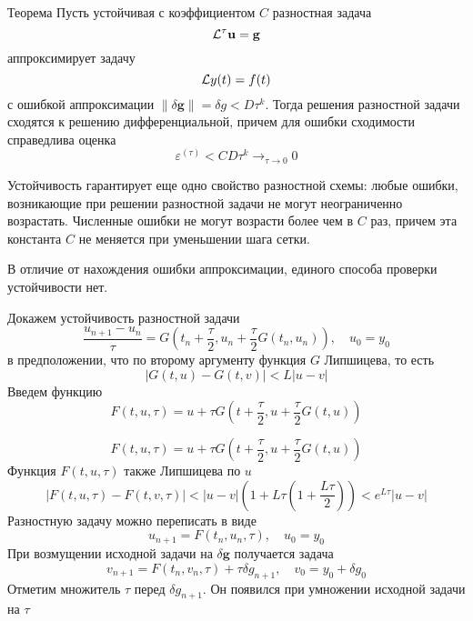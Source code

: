 \documentclass[professionalfonts,compress,unicode]{beamer}
\begin{document}
{
	\begin{block}{Теорема}
		Пусть устойчивая с коэффициентом $C$ разностная задача 
		$$
		{\mathcal{L}^{\tau}} \mathbf{u} = \mathbf{g}
		$$
		аппроксимирует задачу
		$$
		\mathcal{L} y(t) = f(t)
		$$
		с ошибкой аппроксимации $\|\delta \mathbf{g}\| = \delta g < D \tau^k$. Тогда решения разностной задачи 
		сходятся к решению дифференциальной, причем для ошибки сходимости справедлива оценка
		$$
		\varepsilon^{(\tau)} < C D \tau^k \mathop{\longrightarrow}_{\tau \rightarrow 0} 0
		$$
	\end{block}
}


{
%	
	Устойчивость гарантирует еще одно свойство разностной схемы: любые ошибки, возникающие при 
	решении разностной задачи не могут неограниченно возрастать. Численные ошибки не могут возрасти более чем в 
	$C$ раз, причем эта константа $C$ не меняется при уменьшении шага сетки.
}

{
	В отличие от нахождения ошибки аппроксимации, единого способа проверки устойчивости нет.
	
	Докажем устойчивость разностной задачи
	$$
	\frac{u_{n+1}-u_n}{\tau} = G\left(t_n+\frac{\tau}{2},u_n + \frac{\tau}{2}G(t_n, u_n)\right),\quad u_0 = y_0
	$$
	в предположении, что по второму аргументу функция $G$ Липшицева, то есть
	$$
	|G(t, u) - G(t, v)| < L|u-v|
	$$
	Введем функцию
	$$
	F(t, u, \tau) = u+\tau G\left(t+\frac{\tau}{2},u+\frac{\tau}{2}G(t,u)\right)
	$$
}

{
	$$
	F(t, u, \tau) = u+\tau G\left(t+\frac{\tau}{2},u+\frac{\tau}{2}G(t,u)\right)
	$$
	Функция $F(t,u,\tau)$ также Липшицева по $u$
	$$
	|F(t,u,\tau)-F(t,v,\tau)| < |u-v| \left(1 + L\tau\left(1+\frac{L\tau}{2}\right)\right) < e^{L\tau} |u-v|
	$$
	Разностную задачу можно переписать в виде
	$$
	u_{n+1} = F(t_n, u_n, \tau), \quad u_0 = y_0
	$$
	При возмущении исходной задачи на $\delta \mathbf{g}$ получается задача
	$$
	v_{n+1} = F(t_n, v_n, \tau) + \tau \delta g_{n+1}, \quad v_0 = y_0 + \delta g_0
	$$
	Отметим множитель $\tau$ перед $\delta g_{n+1}$. Он появился при умножении исходной задачи на $\tau$
}
\end{document}
